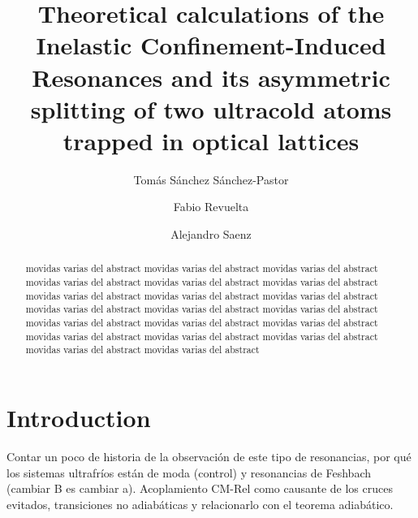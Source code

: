 \documentclass[aps,pre,twocolumn,superscriptaddress,showpacs]{revtex4-1}
\begin{document}
\title{Theoretical calculations of the Inelastic Confinement-Induced Resonances and its asymmetric splitting of two ultracold atoms trapped in optical lattices}
%
\author{Tom\'as S\'anchez S\'anchez-Pastor}

\author{Fabio Revuelta}

\author{Alejandro Saenz}
%
\begin{abstract}
movidas varias del abstract movidas varias del abstract movidas varias del abstract movidas varias del abstract movidas varias del abstract movidas varias del abstract movidas varias del abstract movidas varias del abstract movidas varias del abstract movidas varias del abstract movidas varias del abstract movidas varias del abstract movidas varias del abstract movidas varias del abstract movidas varias del abstract movidas varias del abstract movidas varias del abstract movidas varias del abstract movidas varias del abstract movidas varias del abstract
\end{abstract}

\maketitle

\section{Introduction}  \label{sec:intro}
Contar un poco de historia de la observación de este tipo de resonancias, por qué los sistemas ultrafríos están de moda (control) y resonancias de Feshbach (cambiar B es cambiar a). Acoplamiento CM-Rel como causante de los cruces evitados, transiciones no adiabáticas y relacionarlo con el teorema adiabático.
\end{document}
